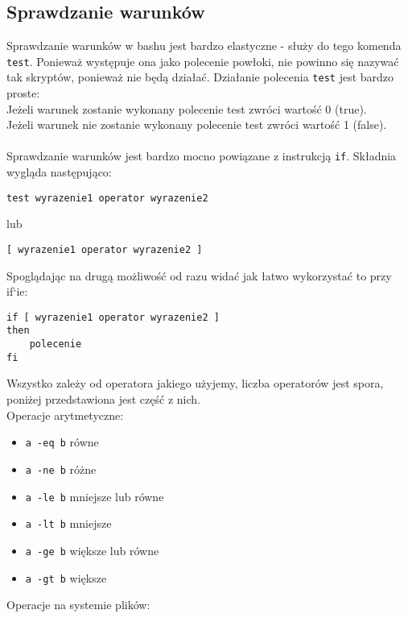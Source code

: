 \subsection{Sprawdzanie warunków}
Sprawdzanie warunków w bashu jest bardzo elastyczne - służy do tego komenda \texttt{test}. Ponieważ występuje ona jako polecenie powłoki, nie powinno się nazywać tak skryptów, ponieważ nie będą działać. Działanie polecenia \texttt{test} jest bardzo proste:\\
Jeżeli warunek zostanie wykonany polecenie test zwróci wartość 0 (true).\\
Jeżeli warunek nie zostanie wykonany polecenie test zwróci wartość 1 (false).\\\\
Sprawdzanie warunków jest bardzo mocno powiązane z instrukcją \texttt{if}. Składnia wygląda następująco:
\begin{lstlisting}
test wyrazenie1 operator wyrazenie2
\end{lstlisting}
lub
\begin{lstlisting}
[ wyrazenie1 operator wyrazenie2 ]
\end{lstlisting}
Spoglądając na drugą możliwość od razu widać jak łatwo wykorzystać to przy if`ie:
\begin{lstlisting}
if [ wyrazenie1 operator wyrazenie2 ]
then
	polecenie
fi
\end{lstlisting}
Wszystko zależy od operatora jakiego użyjemy, liczba operatorów jest spora, poniżej przedstawiona jest część z nich.\\
Operacje arytmetyczne:
\begin{itemize}[itemsep=0cm,leftmargin=1cm]
\item \texttt{a -eq b} równe
\item \texttt{a -ne b} różne
\item \texttt{a -le b} mniejsze lub równe
\item \texttt{a -lt b} mniejsze
\item \texttt{a -ge b} większe lub równe
\item \texttt{a -gt b} większe
\end{itemize}
Operacje na systemie plików:
